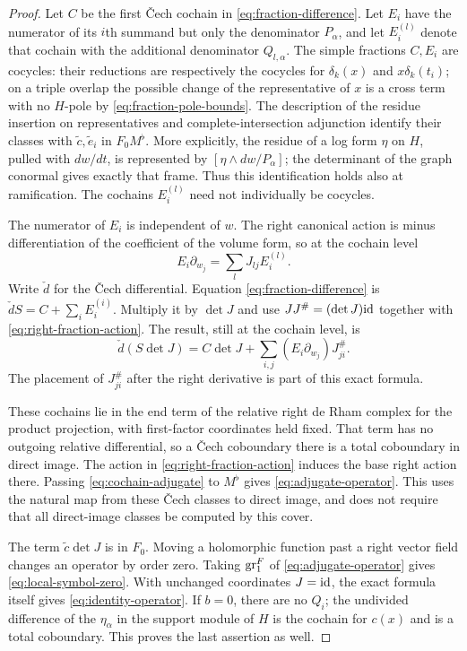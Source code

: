 \begin{proof}
Let \(C\) be the first \v Cech cochain in
\eqref{eq:fraction-difference}.  Let \(E_i\) have the numerator of its
\(i\)th summand but only the denominator \(P_\alpha\), and let
\(E_i^{(l)}\) denote that cochain with the additional denominator
\(Q_{l,\alpha}\).  The simple fractions \(C,E_i\) are cocycles: their
reductions are respectively the cocycles for \(\delta_k(x)\) and
\(x\delta_k(t_i)\); on a triple overlap the possible change of the
representative of \(x\) is a cross term with no \(H\)-pole by
\eqref{eq:fraction-pole-bounds}.  The description of the residue insertion on representatives and
complete-intersection adjunction identify their classes with
\(\widetilde c,\widetilde e_i\) in \(F_0M^\flat\).  More explicitly,
the residue of a log form \(\eta\) on \(H\), pulled with \(dw/dt\), is
represented by \([\eta\wedge dw/P_\alpha]\); the determinant of the
graph conormal gives exactly that frame.  Thus this identification holds
also at ramification.  The cochains \(E_i^{(l)}\) need not individually
be cocycles.

The numerator of \(E_i\) is independent of \(w\).  The right canonical
action is minus differentiation of the coefficient of the volume form,
so at the cochain level
\begin{equation}\label{eq:right-fraction-action}
 E_i\partial_{w_j}=\sum_l J_{lj}E_i^{(l)}.
\end{equation}
Write \(\check d\) for the \v Cech differential.  Equation
\eqref{eq:fraction-difference} is
\(\check dS=C+\sum_iE_i^{(i)}\).  Multiply it by \(\det J\) and use
\(JJ^\#=(\det J)\mathrm{id}\) together with
\eqref{eq:right-fraction-action}.  The result, still at the cochain
level, is
\begin{equation}\label{eq:cochain-adjugate}
 \check d(S\det J)=C\det J+
 \sum_{i,j}(E_i\partial_{w_j})J^\#_{ji}.
\end{equation}
The placement of \(J^\#_{ji}\) after the right derivative is part of
this exact formula.

These cochains lie in the end term of the relative right de Rham complex
for the product projection, with first-factor coordinates held fixed.
That term has no outgoing relative differential, so a \v Cech coboundary
there is a total coboundary in direct image.  The action in
\eqref{eq:right-fraction-action} induces the base right action there.
Passing \eqref{eq:cochain-adjugate} to \(M^\flat\) gives
\eqref{eq:adjugate-operator}.  This uses the natural map from these
\v Cech classes to direct image, and does not require that all direct-image
classes be computed by this cover.

The term \(\widetilde c\det J\) is in \(F_0\).  Moving a holomorphic
function past a right vector field changes an operator by order zero.
Taking \(\operatorname{gr}^F_1\) of \eqref{eq:adjugate-operator} gives
\eqref{eq:local-symbol-zero}.  With unchanged coordinates \(J=\mathrm{id}\),
the exact formula itself gives \eqref{eq:identity-operator}.  If \(b=0\),
there are no \(Q_i\); the undivided difference of the \(\eta_\alpha\)
in the support module of \(H\) is the cochain for \(c(x)\) and is a total
coboundary.  This proves the last assertion as well.
\end{proof}

